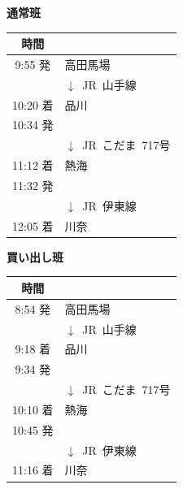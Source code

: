 \documentclass[unicode,a4paper,11pt]{ltjsarticle}
\begin{document}
\begin{center}
      \begin{minipage}[ht]{0.48\columnwidth}
            \textbf{通常班}

            \vspace*{5pt}

            \begin{tabular}{cl}\hline
                  時間     &                                 \\ \hline
                  9:55 発  & 高田馬場                        \\
                           & $\downarrow$\ JR\ 山手線        \\
                  10:20 着 & 品川                            \\
                  10:34 発 &                                 \\
                           & $\downarrow$\ JR\ こだま\ 717号 \\
                  11:12 着 & 熱海                            \\
                  11:32 発 &                                 \\
                           & $\downarrow$\ JR\ 伊東線        \\
                  12:05 着 & 川奈                            \\ \hline
            \end{tabular}
      \end{minipage}
      \begin{minipage}[ht]{0.48\columnwidth}
            \textbf{買い出し班}

            \vspace*{5pt}

            \begin{tabular}{cl}\hline
                  時間     &                                 \\ \hline
                  8:54 発  & 高田馬場                        \\
                           & $\downarrow$\ JR\ 山手線        \\
                  9:18 着  & 品川                            \\
                  9:34 発  &                                 \\
                           & $\downarrow$\ JR\ こだま\ 717号 \\
                  10:10 着 & 熱海                            \\
                  10:45 発 &                                 \\
                           & $\downarrow$\ JR\ 伊東線        \\
                  11:16 着 & 川奈                            \\ \hline
            \end{tabular}
      \end{minipage}
\end{center}
\end{document}
